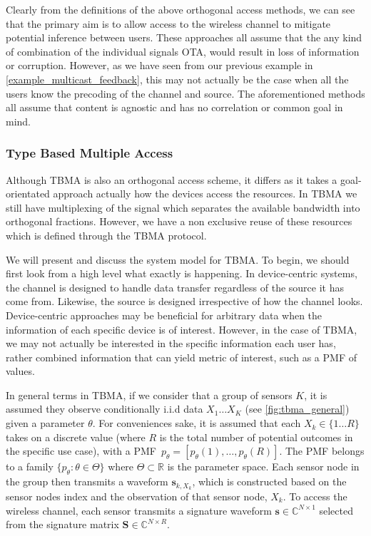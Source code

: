 \documentclass{article}
\begin{document}
Clearly from the definitions of the above orthogonal access methods, we can see that the primary aim is to allow access to the wireless channel to mitigate potential inference between users. These approaches all assume that the any kind of combination of the individual signals \ac{OTA}, would result in loss of information or corruption. However, as we have seen from our previous example in \cref{example_multicast_feedback}, this may not actually be the case when all the users know the precoding of the channel and source. The aforementioned methods all assume that content is agnostic and has no correlation or common goal in mind. 

\subsubsection{Type Based Multiple Access}

Although \ac{TBMA} is also an orthogonal access scheme, it differs as it takes a goal-orientated approach actually how the devices access the resources. In \ac{TBMA} we still have multiplexing of the signal which separates the available bandwidth into orthogonal fractions. However, we have a non exclusive reuse of these resources which is defined through the TBMA protocol. 

We will present and discuss the system model for TBMA. To begin, we should first look from a high level what exactly is happening. In device-centric systems, the channel is designed to handle data transfer regardless of the source it has come from. Likewise, the source is designed irrespective of how the channel looks. Device-centric approaches may be beneficial for arbitrary data when the information of each specific device is of interest. However, in the case of TBMA, we may not actually be interested in the specific information each user has, rather combined information that can yield metric of interest, such as a \ac{PMF} of values. 

In general terms in TBMA, if we consider that a group of sensors $K$, it is assumed they observe conditionally \ac{i.i.d} data $X_1 \dots X_K $ (see \cref{fig:tbma_general}) given a parameter $\theta$. For conveniences sake, it is assumed that each $X_k \in \{1 \dots R\}$ takes on a discrete value (where $R$ is the total number of potential outcomes in the specific use case), with a \ac{PMF}~${p_{\theta} = [p_{\theta}(1), \ldots, p_{\theta}(R)]}$. The \ac{PMF} belongs to a family $\{p_{\theta}: \theta \in \Theta\}$ where $\Theta \subset \mathbb{R}$ is the parameter space. Each sensor node in the group then transmits a waveform $\boldsymbol{s}_{k,X_k}$, which is constructed based on the sensor nodes index and the observation of that sensor node, $X_k$. To access the wireless channel, each sensor transmits a signature waveform $\boldsymbol{s} \in \mathbb{C}^{N \times 1}$ selected from the signature matrix $\boldsymbol{S} \in \mathbb{C}^{N \times R}$.
\end{document}
